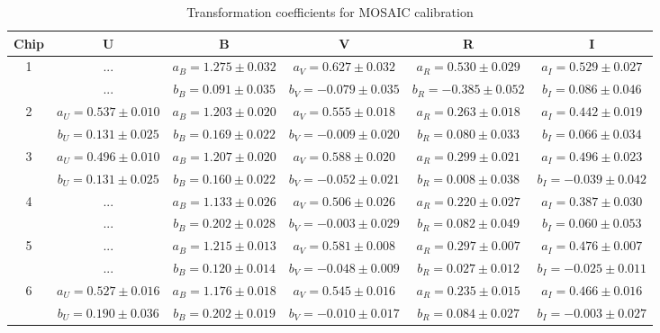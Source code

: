 \documentclass[iop]{emulateapj}
\begin{document}
\begin{table} \centering 
\caption{Transformation coefficients for MOSAIC calibration \label{tab:MOScoeffs}}
\begin{tabular}{c|c|c|c|c|c} \hline \hline
Chip 				& 		U 					& 			B 				& 		V 					& 		R 					& 		I 			 \\ \hline
\multirow{2}{*}{1} 	& ...						& $a_B = 1.275 \pm 0.032$ & $a_V = 0.627 \pm 0.032$  & $a_R = 0.530 \pm 0.029$ 	& $a_I = 0.529 \pm 0.027$ \\
					& ...						& $b_B = 0.091 \pm 0.035$ & $b_V = -0.079 \pm 0.035$ & $b_R = -0.385 \pm 0.052$	& $b_I = 0.086 \pm 0.046$ \\ \hline

\multirow{2}{*}{2} 	& $a_U = 0.537 \pm 0.010$ & $a_B = 1.203 \pm 0.020$ & $a_V = 0.555 \pm 0.018$ 	& $a_R = 0.263 \pm 0.018$ 	& $a_I = 0.442 \pm 0.019$ \\
					& $b_U = 0.131 \pm 0.025$ & $b_B = 0.169 \pm 0.022$	& $b_V = -0.009 \pm 0.020$	& $b_R = 0.080 \pm 0.033$	& $b_I = 0.066 \pm 0.034$ \\ \hline
					
\multirow{2}{*}{3} 	& $a_U = 0.496 \pm 0.010$ & $a_B = 1.207 \pm 0.020$ & $a_V = 0.588 \pm 0.020$ 	& $a_R = 0.299 \pm 0.021$ 	& $a_I = 0.496 \pm 0.023$ \\
					& $b_U = 0.131 \pm 0.025$ & $b_B = 0.160 \pm 0.022$	& $b_V = -0.052 \pm 0.021$	& $b_R = 0.008 \pm 0.038$	& $b_I = -0.039 \pm 0.042$ \\ \hline
					
\multirow{2}{*}{4} 	& ...					  & $a_B = 1.133 \pm 0.026$ & $a_V = 0.506 \pm 0.026$ 	& $a_R = 0.220 \pm 0.027$ 	& $a_I = 0.387 \pm 0.030$ \\
					& ...					  & $b_B = 0.202 \pm 0.028$	& $b_V = -0.003 \pm 0.029$	& $b_R = 0.082 \pm 0.049$	& $b_I = 0.060 \pm 0.053$ \\ \hline
					
\multirow{2}{*}{5} 	& ...					  & $a_B = 1.215 \pm 0.013$ & $a_V = 0.581 \pm 0.008$ 	& $a_R = 0.297 \pm 0.007$ 	& $a_I = 0.476 \pm 0.007$ \\
					& ...					  & $b_B = 0.120 \pm 0.014$	& $b_V = -0.048 \pm 0.009$	& $b_R = 0.027 \pm 0.012$	& $b_I = -0.025 \pm 0.011$ \\ \hline
					
\multirow{2}{*}{6} 	& $a_U = 0.527 \pm 0.016$ & $a_B = 1.176 \pm 0.018$ & $a_V = 0.545 \pm 0.016$ 	& $a_R = 0.235 \pm 0.015$ 	& $a_I = 0.466 \pm 0.016$ \\
					& $b_U = 0.190 \pm 0.036$ & $b_B = 0.202 \pm 0.019$	& $b_V = -0.010 \pm 0.017$	& $b_R = 0.084 \pm 0.027$	& $b_I = -0.003 \pm 0.027$ \\ \hline
					

\end{tabular}
\end{table}
\end{document}
